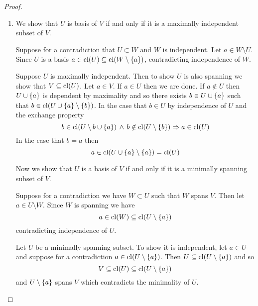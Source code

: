 \begin{proof}
\begin{enumerate}
        \item We show that $U$ is basis of $V$ if and only if it is a 
            maximally independent subset of $V$.

            \begin{forward}
                Suppose for a contradiction that
                $U \subset W$ and $W$ is independent.
                Let $a \in W \setminus U$.
                Since $U$ is a basis 
                $a \in \operatorname{cl}(U) \subseteq \operatorname{cl}(W \setminus \left\{a\right\})$, 
                contradicting independence of $W$.
            \end{forward}

            \begin{backward}
                Suppose $U$ is maximally independent.
                Then to show $U$ is also spanning we show that $V \subseteq \operatorname{cl}(U)$.
                Let $a \in V$. 
                If $a \in U$ then we are done.
                If $a \notin U$ then $U \cup \left\{a\right\}$ is dependent by maximality
                and so there exists $b \in U \cup \left\{a\right\}$ such that 
                $b \in \operatorname{cl}(U \cup \left\{a\right\} \setminus \left\{b\right\})$.
                In the case that $b \in U$ by independence of $U$ and the 
                exchange property
                \[b \in \operatorname{cl}(U \setminus {b} \cup \left\{a\right\}) \, \land \, 
                b \notin \operatorname{cl}(U \setminus \left\{b\right\}) \Rightarrow 
                a \in \operatorname{cl}(U)\]
                In the case that $b = a$ then 
                \[a \in \operatorname{cl}(U \cup \left\{a\right\} \setminus \left\{a\right\}) = \operatorname{cl}(U)\]
            \end{backward}

            Now we show that $U$ is a basis of $V$ if and only if it is a 
            minimally spanning subset of $V$.

            \begin{forward}
                Suppose for a contradiction we have $W \subset U$ such that 
                $W$ spans $V$.
                Then let $a \in U \setminus W$.
                Since $W$ is spanning we have 
                \[a \in \operatorname{cl}(W) \subseteq \operatorname{cl}(U \setminus \left\{a\right\})\]
                contradicting independence of $U$.
            \end{forward}

            \begin{backward}
                Let $U$ be a minimally spanning subset.
                To show it is independent, 
                let $a \in U$ and suppose for a contradiction 
                $a \in \operatorname{cl}(U \setminus \left\{a\right\})$.
                Then $U \subseteq \operatorname{cl}(U \setminus \left\{a\right\})$ and so 
                \[V \subseteq \operatorname{cl}(U) \subseteq \operatorname{cl}(U \setminus \left\{a\right\})\]
                and $U \setminus \left\{a\right\}$ spans $V$
                which contradicts the minimality of $U$.
            \end{backward}
    \end{enumerate}
\end{proof}

